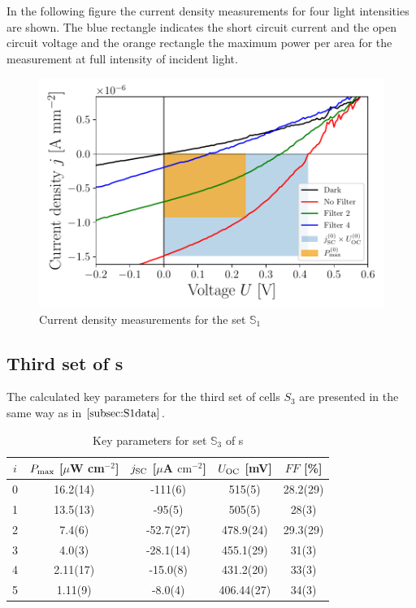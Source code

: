 In the following figure the current density measurements for four light intensities are shown. The blue rectangle indicates the short circuit current and the open circuit voltage and the orange rectangle the maximum power per area for the measurement at full intensity of incident light.

\begin{figure}[h]\centering
\includegraphics[width=\columnwidth]{../../../IV-Curve-Analysis/OSC1Graph.pdf}
\caption{Current density measurements for the set $\mathbb{S}_1$}
\label{fig:OSC1Graph}
\end{figure}

\subsection{Third set of \BHSC s}

The calculated key parameters for the third set of cells $S_3$ are presented in the same way as in $\ref{subsec:S1data}$.

\begin{table}[h]\centering
\caption{Key parameters for set $\mathbb{S}_3$ of \BHSC s}
\label{tab:keyparams3}
\begin{tabular}{@{}ccccc@{}}\toprule
$i$ & $P_{\text{max}}$ [$\mu$W cm$^{-2}$] & $j_{\text{SC}}$ [$\mu$A $\mathrm{cm}^{-2}$] & $U_{\text{OC}}$ [mV] & $FF$ [\%]\\\midrule
0 &   16.2(14)  &  -111(6)  & 515(5) & 28.2(29) \\
1 &   13.5(13)  &  -95(5)  & 505(5) & 28(3) \\
2 &   7.4(6)  &  -52.7(27)  & 478.9(24) & 29.3(29) \\
3 &   4.0(3)  &  -28.1(14)  & 455.1(29) & 31(3) \\
4 &   2.11(17)  &  -15.0(8)  & 431.2(20) & 33(3)\\
5 &  1.11(9)  &  -8.0(4)  & 406.44(27) & 34(3) \\\bottomrule
\end{tabular}
\end{table}

